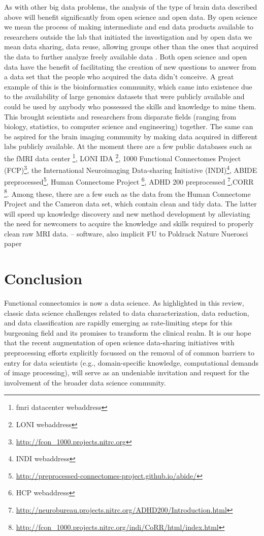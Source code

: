 As with other big data problems, the analysis of the type of brain data
described above will benefit significantly from open science and open data. By
open science we mean the process of making intermediate and end data products
available to researchers outside the lab that initiated the investigation and
by open data we mean data sharing, data reuse, allowing groups other than the
ones that acquired the data to further analyze freely available data
\cite{Milham2012}. Both open science and open data have the benefit of
facilitating the creation of new questions to answer from a data set that the
people who acquired the data didn't conceive. A great example of this is the
bioinformatics community, which came into existence due to the availability of
large genomics datasets that were publicly available and could be used by
anybody who possessed the skills and knowledge to mine them\cite{VanHorn2013}.
This brought scientists and researchers from disparate fields (ranging from
biology, statistics, to computer science and engineering) together. The same
can be aspired for the brain imaging community by making data acquired in
different labs publicly available. At the moment there are a few public
databases such as the fMRI data center \footnote{fmri datacenter webaddress},
LONI IDA \footnote{LONI webaddress}, 1000 Functional Connectomes Project
(FCP)\footnote{\url{http://fcon_1000.projects.nitrc.org}}, the International
Neuroimaging Data-sharing Initiative (INDI)\footnote{INDI webaddress}, ABIDE
preprocessed\footnote{\url{http://preprocessed-connectomes-project.github.io/abide/}},
Human Connectome Project \footnote{HCP webaddress}, ADHD 200 preprocessed
\footnote{\url{http://neurobureau.projects.nitrc.org/ADHD200/Introduction.html}},CORR
\footnote{\url{http://fcon_1000.projects.nitrc.org/indi/CoRR/html/index.html}}.
Among these, there are a few such as the data from the Human Connectome Project
and the Cameron data set, which contain clean and tidy data. The latter will
speed up knowledge discovery and new method development by alleviating the need
for newcomers to acquire the knowledge and skills required to properly clean
raw MRI data. -- software, also implicit FU to Poldrack Nature Nuerosci paper

\section {Conclusion}
Functional connectomics is now a data science. As highlighted in this review, classic data science challenges related to data characterization, data reduction, and data classification 
are rapidly emerging as rate-limiting steps for this burgeoning field and its promises to transform the clinical realm. It is our hope that the recent augmentation of open science data-sharing initiatives with preprocessing efforts explicitly focussed on the removal of of common barriers to entry for data scientists (e.g., domain-specific knowledge, computational demands of image processing), will serve as an undeniable invitation and request for the involvement of the broader data science community.
 


